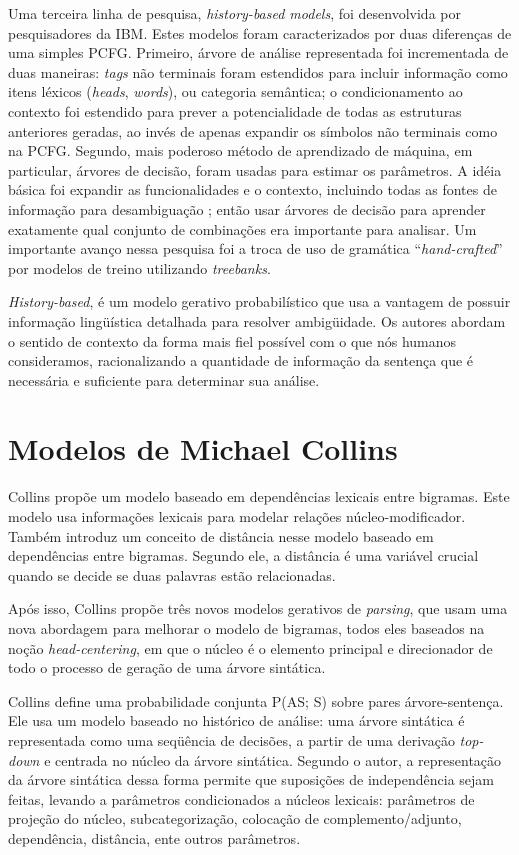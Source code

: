 Uma terceira linha de pesquisa, \emph{history-based models}, foi desenvolvida por pesquisadores da IBM. Estes modelos foram caracterizados por duas diferenças de uma simples PCFG. Primeiro, árvore de análise representada foi incrementada de duas maneiras: \emph{tags} não terminais foram estendidos para incluir informação como itens léxicos (\emph{heads}, \emph{words}), ou categoria semântica; o condicionamento ao contexto foi estendido para prever a potencialidade de todas as estruturas anteriores geradas, ao invés de apenas expandir os símbolos não terminais como na PCFG.
Segundo, mais poderoso método de aprendizado de máquina, em particular, árvores de decisão, foram usadas para estimar os parâmetros. A idéia básica foi expandir as funcionalidades e o contexto, incluindo todas as fontes de informação para desambiguação ; então usar árvores de decisão para aprender exatamente qual conjunto de combinações era importante para analisar.
Um importante avanço nessa pesquisa foi a troca de uso de gramática ``\emph{hand-crafted}''  por modelos de treino utilizando \emph{treebanks}.

\emph{History-based}, é um modelo gerativo probabilístico que usa a vantagem de possuir informação lingüística detalhada para resolver ambigüidade. Os autores abordam o sentido de contexto da forma mais fiel possível com o que nós humanos consideramos, racionalizando a quantidade de informação da sentença
que é necessária e suficiente para determinar sua análise.


\section{Modelos de Michael Collins}
\label{sec:modelos_collins}

Collins \cite{collins97} propõe um modelo baseado em dependências lexicais entre bigramas. Este modelo usa informações lexicais para modelar relações núcleo-modificador. Também introduz um conceito de distância nesse modelo baseado em dependências entre bigramas. Segundo ele, a distância é uma variável crucial quando se decide se duas palavras estão relacionadas.

Após isso, Collins \cite{collins97} propõe três novos modelos gerativos de \emph{parsing}, que usam uma nova abordagem para melhorar o modelo de bigramas, todos eles baseados na noção \emph{head-centering}, em que o núcleo é o elemento principal e direcionador de todo o processo de geração de uma árvore sintática.

Collins define uma probabilidade conjunta P(AS; S) sobre pares árvore-sentença. Ele usa um modelo baseado no histórico de análise: uma árvore sintática é representada como uma seqüência de decisões, a partir de uma derivação \emph{top-down} e centrada no núcleo da árvore sintática. Segundo o autor, a representação da árvore sintática dessa forma permite que suposições de independência sejam feitas, levando a parâmetros condicionados a núcleos lexicais: parâmetros de projeção do núcleo, subcategorização, colocação de complemento/adjunto, dependência, distância, ente outros parâmetros.

